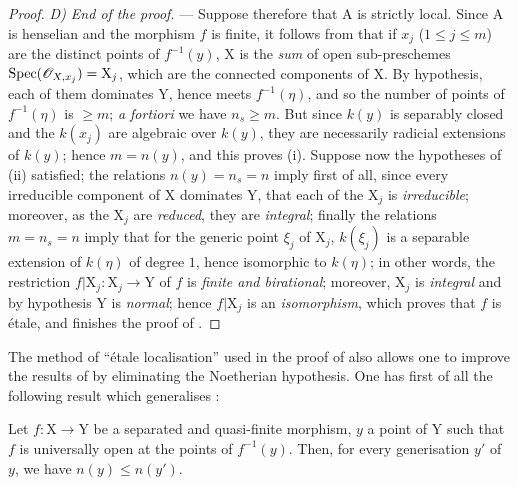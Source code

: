 \begin{proof}
\emph{D) End of the proof.} ---
Suppose therefore that $\mathrm{A}$ is strictly local.
Since $\mathrm{A}$ is henselian and the morphism $f$ is finite, it follows from  that if $x_j$ ($1\leq j\leq m$) are the distinct points of $f^{-1}(y)$, $\mathrm{X}$ is the \emph{sum} of open sub-preschemes $\operatorname{Spec}(\mathscr{O}_{X,x_j})=\mathrm{X}_j$, which are the connected components of $\mathrm{X}$.
By hypothesis, each of them dominates $\mathrm{Y}$, hence meets $f^{-1}(\eta)$, and so the number of points of $f^{-1}(\eta)$ is $\geq m$; \emph{a fortiori} we have $n_s\geq m$.
But since $k(y)$ is separably closed and the $k(x_j)$ are algebraic over $k(y)$, they are necessarily radicial extensions of $k(y)$; hence $m=n(y)$, and this proves (i).
Suppose now the hypotheses of (ii) satisfied; the relations $n(y)=n_s=n$ imply first of all, since every irreducible component of $\mathrm{X}$ dominates $\mathrm{Y}$, that each of the $\mathrm{X}_j$ is \emph{irreducible}; moreover, as the $\mathrm{X}_j$ are \emph{reduced}, they are \emph{integral}; finally the relations $m=n_s=n$ imply that for the generic point $\xi_j$ of $\mathrm{X}_j$, $k(\xi_j)$ is a separable extension of $k(\eta)$ of degree $1$, hence isomorphic to $k(\eta)$; in other words, the restriction $f|\mathrm{X}_j:\mathrm{X}_j\to\mathrm{Y}$ of $f$ is \emph{finite and birational}; moreover, $\mathrm{X}_j$ is \emph{integral} and by hypothesis $\mathrm{Y}$ is \emph{normal}; hence  $f|\mathrm{X}_j$ is an \emph{isomorphism}, which proves that $f$ is \'etale, and finishes the proof of .
\end{proof}

\begin{remark}[18.10.17]
\label{IV.18.10.17}
The method of ``\'etale localisation'' used in the proof of  also allows one to improve the results of  by eliminating the Noetherian hypothesis.
One has first of all the following result which generalises :
\end{remark}

\begin{env}[18.10.17.1]
\label{IV.18.10.17.1}
Let $f:\mathrm{X}\to\mathrm{Y}$ be a separated and quasi-finite morphism, $y$ a point of $\mathrm{Y}$ such that $f$ is universally open at the points of $f^{-1}(y)$.
Then, for every generisation $y'$ of $y$, we have $n(y)\leq n(y')$.
\end{env}

